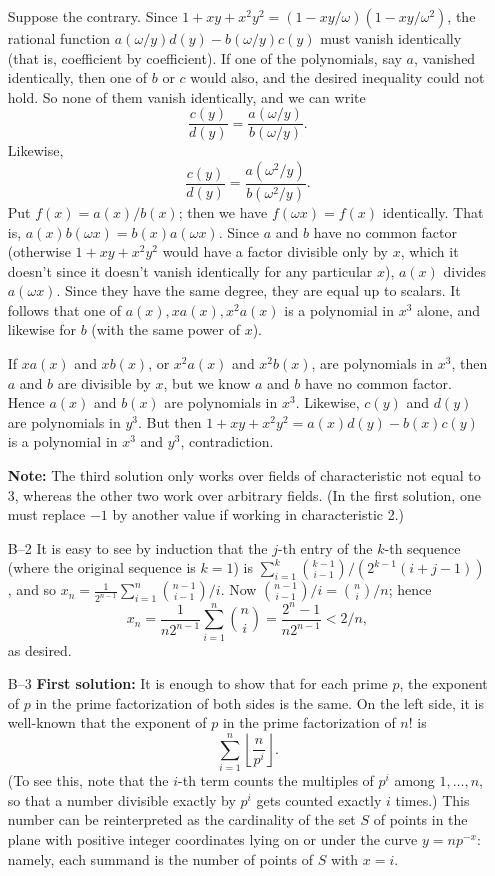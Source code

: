 \documentclass[amssymb,twocolumn,pra,10pt,aps]{revtex4-1}
\begin{document}
\begin{itemize}
Suppose the contrary.  Since $1+xy+x^2y^2 = (1 - xy/\omega)(1 -
xy/\omega^2)$, the rational function $a(\omega/y) d(y) - b(\omega/y) c(y)$
must vanish identically (that is, coefficient by coefficient).  If one of
the polynomials, say $a$, vanished identically, then one of $b$ or $c$
would also, and the desired inequality could not hold. So none of them
vanish identically, and we can write
\[
\frac{c(y)}{d(y)} = \frac{a(\omega/y)}{b(\omega/y)}.
\]
Likewise,
\[
\frac{c(y)}{d(y)}= \frac{a(\omega^2/y)}{b(\omega^2/y)}.
\]
Put $f(x) = a(x)/b(x)$; then we have $f(\omega x) = f(x)$ identically. That is,
$a(x) b(\omega x) = b(x) a(\omega x)$. Since $a$ and $b$ have no common
factor (otherwise $1+xy+x^2y^2$ would have a factor divisible only by
$x$, which it doesn't since it doesn't vanish identically for any particular
$x$), $a(x)$ divides $a(\omega x)$. Since they have the same degree, they
are equal up to scalars. It follows that one of $a(x), xa(x), x^2a(x)$
is a polynomial in $x^3$ alone, and likewise for $b$ (with the same
power of $x$).

If $xa(x)$ and $xb(x)$, or $x^2 a(x)$ and $x^2 b(x)$, are polynomials in
$x^3$, then $a$ and $b$ are divisible by $x$, but we know $a$ and $b$ have no
common factor. Hence $a(x)$ and $b(x)$ are polynomials in $x^3$. Likewise,
$c(y)$ and $d(y)$ are polynomials in $y^3$. But then $1 + xy + x^2 y^2 =
a(x)d(y) - b(x) c(y)$ is a polynomial in $x^3$ and $y^3$, contradiction.

\textbf{Note:}
The third solution only works over fields of characteristic not equal to 3,
whereas the other two work over arbitrary fields. (In the first solution,
one must replace $-1$ by another value if working in characteristic 2.)

\item[B--2]
It is easy to see by induction that the $j$-th entry of the $k$-th
sequence (where the original sequence is $k=1$) is
$\sum_{i=1}^k \binom{k-1}{i-1}/(2^{k-1} (i+j-1))$, and so
$x_n = \frac{1}{2^{n-1}} \sum_{i=1}^n \binom{n-1}{i-1}/i$.
Now $\binom{n-1}{i-1}/i = \binom{n}{i}/n$; hence
\[
x_n = \frac{1}{n2^{n-1}} \sum_{i=1}^n \binom{n}{i}
= \frac{2^n-1}{n 2^{n-1}} < 2/n,
\]
as desired.


\item[B--3]
\textbf{First solution:}
It is enough to show that for each prime $p$, the exponent of $p$ in
the prime factorization of both sides is the same.
On the left side, it is well-known that the exponent of $p$ in the
prime factorization of $n!$ is
\[
\sum_{i =1}^n \left\lfloor \frac{n}{p^i} \right\rfloor.
\]
(To see this, note that the $i$-th term counts the multiples of $p^i$ among
$1, \dots, n$, so that a number divisible exactly by $p^i$ gets counted
exactly $i$ times.)  This number can be reinterpreted as the cardinality
of the set $S$ of points in the plane with positive integer coordinates
lying on or under the curve $y = np^{-x}$: namely, each summand is the
number of points of $S$ with $x=i$.


\end{itemize}
\end{document}
